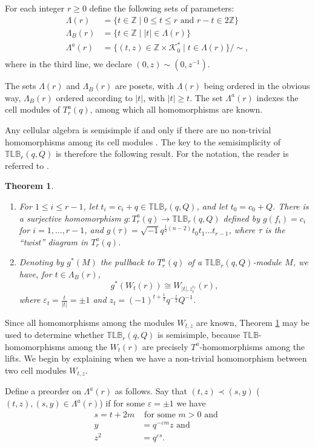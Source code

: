 \documentclass[12pt]{amsart}
\newtheorem{theorem}{Theorem}[section]
\theoremstyle{definition}
\theoremstyle{remark}
\numberwithin{equation}{section}
\newcommand{\Z}{{\mathbb Z}}
\newcommand{\CK}{{\mathcal K}}
\newcommand{\be}{\begin{equation}}
\newcommand{\ee}{\end{equation}}
\newcommand{\inv}{^{-1}}
\newcommand{\half}{\frac{1}{2}}
\newcommand{\lr}{\longrightarrow}
\newcommand{\ve}{{\varepsilon}}
\newcommand{\TLBB}{{\mathbb{TLB}}}
\begin{document}
For each integer $r\geq 0$ define the following sets of parameters:
\be\label{eq:params}
\begin{aligned}
\Lambda(r)&=\{t\in\Z\mid 0\leq t\leq r \text{ and }r-t\in 2\Z\}\\
\Lambda_B(r)&=\{t\in\Z\mid |t|\in\Lambda(r)\}\\
\Lambda^a(r)&=\{(t,z)\in\Z\times \CK_0^*\mid t\in\Lambda(r)\}/\sim,\\
\end{aligned}
\ee
where in the third line, we declare $(0,z)\sim(0,z\inv)$.

The sets $\Lambda(r)$ and $\Lambda_B(r)$ are posets, with $\Lambda(r)$ being ordered in the obvious way, $\Lambda_B(r)$ ordered according
to $|t|$, with $|t|\geq t$. The set $\Lambda^a(r)$ indexes the cell modules of $T^a_r(q)$, among which all homomorphisms are known.

Any cellular algebra is semisimple if and only if there are no non-trivial homomorphisms among its cell modules \cite{GL96}. The key to the semisimplicity
of $\TLBB_r(q,Q)$ is therefore the following result. For the notation, the reader is referred to \cite[\S 5]{GL03}.

\begin{theorem}\label{thm:pullback}\cite[Cor (5.11), Thm. (6.15)]{GL03}
 \begin{enumerate}
\item For $1\leq i\leq r-1$, let $t_i=c_i+q\in\TLBB_r(q,Q)$, and let $t_0=c_0+Q$. There is a surjective homomorphism $g:T^a_r(q)\lr\TLBB_r(q,Q)$
defined by $g(f_i)=c_i$ for $i=1,\dots,r-1$, and $g(\tau)=\sqrt{-1}q^{\half(n-2)}t_0t_1\dots t_{r-1}$, where $\tau$ is the ``twist'' diagram in $T^a_r(q)$.
\item Denoting by $g^*(M)$ the pullback to $T^a_r(q)$ of a $\TLBB_r(q,Q)$-module $M$, we have, for $t\in\Lambda_B(r)$,
\[
g^*(W_t(r))\cong W_{|t|,z_t^{\varepsilon_t}}(r),
\]
where $\varepsilon_t=\frac{t}{|t|}=\pm 1$ and $z_t=(-1)^{t+\half}q^{-\frac{t}{2}}Q\inv$.
\end{enumerate}
\end{theorem}

Since all homomorphisms among the modules $W_{t,z}$ are known, Theorem \ref{thm:pullback} may be used to determine
whether $\TLBB_r(q,Q)$ is semisimple, because $\TLBB$-homomorphisms among the $W_t(r)$ are precisely
$T^a$-homomorphisms among the lifts. We begin by explaining when we have a non-trivial homomorphism between two
cell modules $W_{t,z}$.

Define a preorder on $\Lambda^a(r)$ as follows. Say that $(t,z)\prec (s,y)$ ($(t,z),(s,y)\in\Lambda^a(r)$) if for some $\ve=\pm 1$
we have
\be\label{eq:preorder}
\begin{aligned}
s=t+2m &\text {  for some }m>0\text{ and }\\
y&=q^{-\ve m}z\text{ and }\\
z^2&=q^{\ve s}.\\
\end{aligned}
\ee
\end{document}
